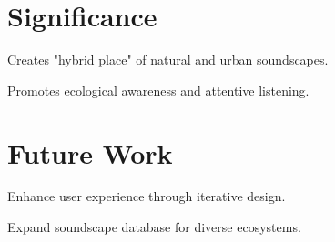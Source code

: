 \documentclass[a4paper]{article}
\begin{document}
{\begin{multicols}{2}
        \section{Significance}
        \begin{compactitem}
            \item Creates "hybrid place" of natural and urban soundscapes.
            \item Promotes ecological awareness and attentive listening.
        \end{compactitem}

        \section{Future Work}
        \begin{compactitem}
            \item Enhance user experience through iterative design.
            \item Expand soundscape database for diverse ecosystems.
        \end{compactitem}
    \end{multicols}
}


\end{document}
